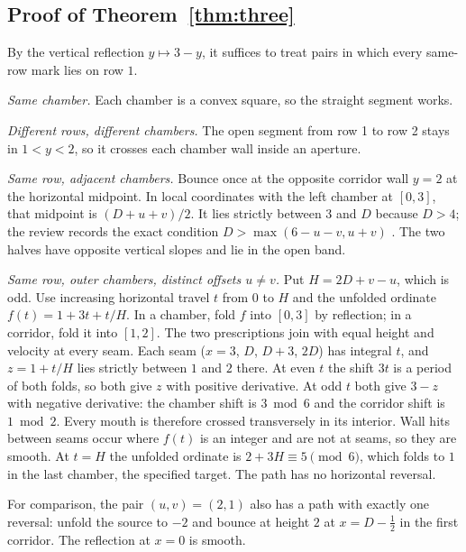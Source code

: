 \documentclass[11pt]{article}
\theoremstyle{definition}
\theoremstyle{remark}
\begin{document}
\subsection{Proof of Theorem~\ref{thm:three}}
By the vertical reflection $y\mapsto 3-y$, it suffices to treat pairs in which
every same-row mark lies on row $1$.

\emph{Same chamber.} Each chamber is a convex square, so the straight segment
works.

\emph{Different rows, different chambers.} The open segment from row 1 to row 2
stays in $1<y<2$, so it crosses each chamber wall inside an aperture.

\emph{Same row, adjacent chambers.} Bounce once at the opposite corridor wall
$y=2$ at the horizontal midpoint. In local coordinates with the left chamber at
$[0,3]$, that midpoint is $(D+u+v)/2$. It lies strictly between $3$ and $D$
because $D>4$; the review records the exact condition
$D>\max(6-u-v,u+v)$ \cite{d200}. The two halves have opposite vertical slopes
and lie in the open band.

\emph{Same row, outer chambers, distinct offsets $u\ne v$.} Put $H=2D+v-u$,
which is odd. Use increasing horizontal travel $t$ from $0$ to $H$ and the
unfolded ordinate $f(t)=1+3t+t/H$. In a chamber, fold $f$ into $[0,3]$ by
reflection; in a corridor, fold it into $[1,2]$. The two prescriptions join with
equal height and velocity at every seam. Each seam ($x=3$, $D$, $D+3$, $2D$) has
integral $t$, and $z=1+t/H$ lies strictly between $1$ and $2$ there. At even $t$
the shift $3t$ is a period of both folds, so both give $z$ with positive
derivative. At odd $t$ both give $3-z$ with negative derivative: the chamber
shift is $3\bmod 6$ and the corridor shift is $1\bmod 2$. Every mouth is
therefore crossed transversely in its interior. Wall hits between seams occur
where $f(t)$ is an integer and are not at seams, so they are smooth. At $t=H$
the unfolded ordinate is $2+3H\equiv 5\pmod 6$, which folds to $1$ in the last
chamber, the specified target. The path has no horizontal reversal.

For comparison, the pair $(u,v)=(2,1)$ also has a path with exactly one
reversal: unfold the source to $-2$ and bounce at height $2$ at
$x=D-\tfrac12$ in the first corridor. The reflection at $x=0$ is smooth.
\end{document}
